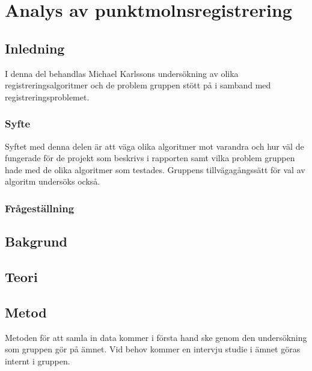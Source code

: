 \chapter{Analys av punktmolnsregistrering}
\label{cha:indiv-report-karlsson}


\section{Inledning}
\label{sec:introduction-karlsson}

I denna del behandlas Michael Karlssons undersökning av olika registreringsalgoritmer och de problem gruppen stött på i samband med registreringsproblemet.

\subsection{Syfte}
\label{sec:purpose-karlsson}

Syftet med denna delen är att väga olika algoritmer mot varandra och hur väl de fungerade för de projekt som beskrivs i rapporten samt vilka problem gruppen hade med de olika algoritmer som testades. Gruppens tillvägagångssätt för val av algoritm undersöks också.


\subsection{Frågeställning}
\label{sec:issue-karlsson}


\section{Bakgrund}
\label{sec:background-karlsson}


\section{Teori}
\label{sec:theory-karlsson}


\section{Metod}
\label{sec:method-karlsson}

Metoden för att samla in data kommer i första hand ske genom den undersökning som gruppen gör på ämnet. Vid behov kommer en intervju studie i ämnet göras internt i gruppen. 


